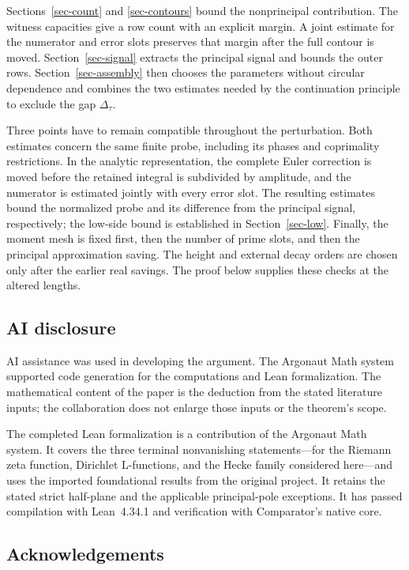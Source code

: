 \documentclass[10pt,reqno,a4paper]{amsart}
\theoremstyle{remark}
\begin{document}
Sections~\ref{sec-count} and \ref{sec-contours} bound the nonprincipal
contribution. The witness capacities give a row count with an explicit
margin. A joint estimate for the numerator and error slots preserves that
margin after the full contour is moved. Section~\ref{sec-signal} extracts
the principal signal and bounds the outer rows. Section~\ref{sec-assembly}
then chooses the parameters without circular dependence and combines the
two estimates needed by the continuation principle to exclude the gap
$\Delta_\tau$.

Three points have to remain compatible throughout the perturbation.
Both estimates concern the same finite probe, including its phases and
coprimality restrictions. In the analytic representation, the complete
Euler correction is moved before the retained integral is subdivided by
amplitude, and the numerator is estimated jointly with every error slot.
The resulting estimates bound the normalized probe and its difference
from the principal signal, respectively; the low-side bound is established
in Section~\ref{sec-low}. Finally, the moment mesh is fixed first, then
the number of prime slots, and then the principal approximation saving.
The height and external decay orders are chosen only after the earlier
real savings. The proof below supplies these checks at the altered lengths.

\subsection{AI disclosure}

AI assistance was used in developing the argument. The Argonaut Math
system supported code generation for the computations and Lean formalization.
The mathematical content of the paper is the deduction from the stated
literature inputs; the collaboration does not enlarge those inputs or the
theorem's scope.

The completed Lean formalization is a contribution of the Argonaut Math
system. It covers the three terminal nonvanishing statements---for the
Riemann zeta function, Dirichlet L-functions, and the Hecke family
considered here---and uses the imported foundational results from the
original project. It retains the stated strict half-plane and the
applicable principal-pole exceptions. It has passed compilation with
Lean~4.34.1 and verification with Comparator's native core.

\subsection{Acknowledgements}
\end{document}
